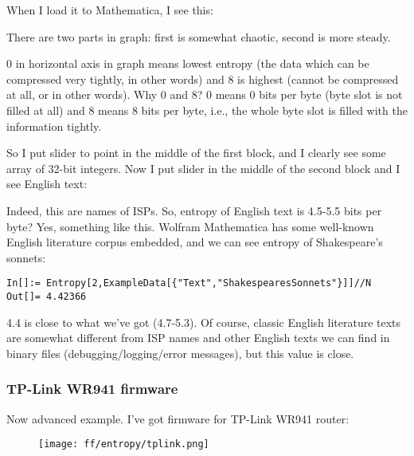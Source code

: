 When I load it to Mathematica, I see this:

\begin{figure}[H]
\centering
{}
\end{figure}

There are two parts in graph: first is somewhat chaotic, second is more steady.

0 in horizontal axis in graph means lowest entropy (the data which can be compressed very tightly,  in other words) 
and 8 is highest (cannot be compressed at all,  or  in other words).
Why 0 and 8? 0 means 0 bits per byte (byte slot is not filled at all) 
and 8 means 8 bits per byte, i.e., the whole byte slot is filled with the information tightly.

So I put slider to point in the middle of the first block, and I clearly see some array of 32-bit integers.
Now I put slider in the middle of the second block and I see English text:

\begin{figure}[H]
\centering
{}
\end{figure}

Indeed, this are names of ISPs.
So, entropy of English text is 4.5-5.5 bits per byte? Yes, something like this.
Wolfram Mathematica has some well-known English literature corpus embedded, and we can see entropy of Shakespeare's sonnets:

\begin{lstlisting}[style=custommath]
In[]:= Entropy[2,ExampleData[{"Text","ShakespearesSonnets"}]]//N
Out[]= 4.42366
\end{lstlisting}

4.4 is close to what we've got (4.7-5.3). 
Of course, classic English literature texts are somewhat different from ISP names and other English texts we can find in binary files 
(debugging/logging/error messages), but this value is close.

\subsubsection{TP-Link WR941 firmware}

Now advanced example. I've got firmware for TP-Link WR941 router:

\begin{figure}[H]
\centering
\texttt{[image: ff/entropy/tplink.png]}
\end{figure}

